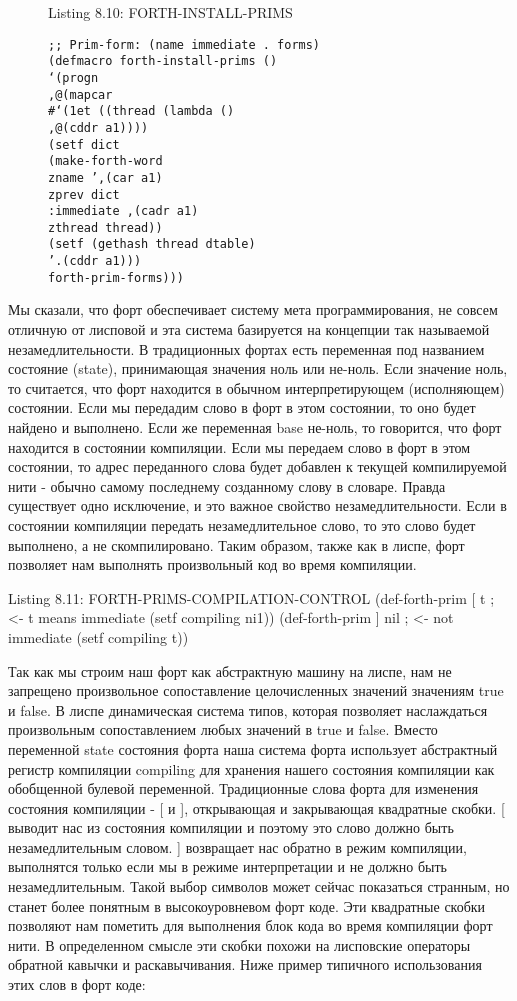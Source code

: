 \begin{figure}Listing 8.10: FORTH-INSTALL-PRIMS\label{listing_8.10}
\listbegin
\begin{verbatim}
;; Prim-form: (name immediate . forms)
(defmacro forth-install-prims ()
‘(progn
,@(mapcar
#‘(1et ((thread (lambda ()
,@(cddr a1))))
(setf dict
(make-forth-word
zname ’,(car a1)
zprev dict
:immediate ,(cadr a1)
zthread thread))
(setf (gethash thread dtable)
’.(cddr a1)))
forth-prim-forms)))
\end{verbatim}
\listend
\end{figure}

Мы сказали, что форт обеспечивает систему мета программирования, не совсем отличную от лисповой и эта система базируется на концепции так называемой незамедлительности. В традиционных фортах есть переменная под названием состояние (state), принимающая значения ноль или не-ноль. Если значение ноль, то считается, что форт находится в обычном интерпретирующем (исполняющем) состоянии. Если мы передадим слово в форт в этом состоянии, то оно будет найдено и выполнено. Если же переменная base не-ноль, то говорится, что форт находится в состоянии компиляции. Если мы передаем слово в форт в этом состоянии, то адрес переданного слова будет добавлен к текущей компилируемой нити - обычно самому последнему созданному слову в словаре. Правда существует одно исключение, и это важное свойство незамедлительности. Если в состоянии компиляции передать незамедлительное слово, то это слово будет выполнено, а не скомпилировано. Таким образом, также как в лиспе, форт позволяет нам выполнять произвольный код во время компиляции.

Listing 8.11: FORTH-PRlMS-COMPILATION-CONTROL
(def-forth-prim [ t ; <- t means immediate
(setf compiling ni1))
(def-forth-prim ] nil ; <- not immediate
(setf compiling t))

Так как мы строим наш форт как абстрактную машину на лиспе, нам не запрещено произвольное сопоставление целочисленных значений значениям true и false. В лиспе динамическая система типов, которая позволяет наслаждаться произвольным сопоставлением любых значений в true и false. Вместо переменной state состояния форта наша система форта использует абстрактный регистр компиляции compiling для хранения нашего состояния компиляции как обобщенной булевой переменной. Традиционные слова форта для изменения состояния компиляции - [ и ], открывающая и закрывающая квадратные скобки. [ выводит нас из состояния компиляции и поэтому это слово должно быть незамедлительным словом. ] возвращает нас обратно в режим компиляции, выполнятся только если мы в режиме интерпретации и не должно быть незамедлительным. Такой выбор символов может сейчас показаться странным, но станет более понятным в высокоуровневом форт коде. Эти квадратные скобки позволяют нам пометить для выполнения блок кода во время компиляции форт нити. В определенном смысле эти скобки похожи на лисповские операторы обратной кавычки и раскавычивания. Ниже пример типичного использования этих слов в форт коде:

